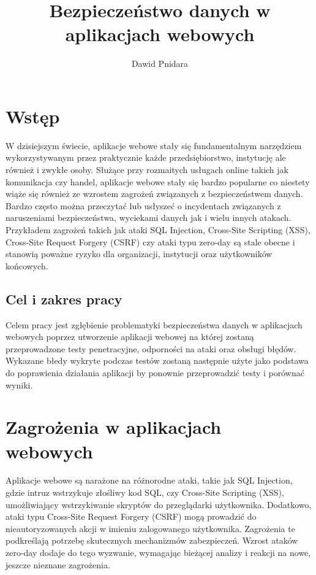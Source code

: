 \documentclass[12pt,twoside]{article}
\author{Dawid Pnidara}
\title{Bezpieczeństwo danych w aplikacjach webowych}
\begin{document}
\maketitle

\blankpage

\tableofcontents

\clearpage
\blankpage

\section{Wstęp}
W dzisiejszym świecie, aplikacje webowe stały się fundamentalnym narzędziem wykorzystywanym przez praktycznie każde przedsiębiorstwo, instytucję ale również i zwykłe osoby. Służące przy rozmaitych usługach online takich jak komunikacja czy handel, aplikacje webowe stały się bardzo popularne co niestety wiąże się również ze wzrostem zagrożeń związanych z bezpieczeństwem danych. 
Bardzo często można przeczytać lub usłyszeć o incydentach związanych z naruszeniami bezpieczeństwa, wyciekami danych jak i wielu innych atakach. Przykładem zagrożeń takich jak ataki SQL Injection, Cross-Site Scripting (XSS), Cross-Site Request Forgery (CSRF) czy ataki typu zero-day są stale obecne i stanowią poważne ryzyko dla organizacji, instytucji oraz użytkowników końcowych.
\subsection{Cel i zakres pracy}
Celem pracy jest zgłębienie problematyki bezpieczeństwa danych w aplikacjach webowych poprzez utworzenie aplikacji webowej na której zostaną przeprowadzone testy penetracyjne, odporności na ataki oraz obsługi błędów. Wykazane błedy wykryte podczas testów zostaną następnie użyte jako podstawa do poprawienia działania aplikacji by ponownie przeprowadzić testy i porównać wyniki.
\section{Zagrożenia w aplikacjach webowych}

Aplikacje webowe są narażone na różnorodne ataki, takie jak SQL Injection, gdzie intruz wstrzykuje złośliwy kod SQL, czy Cross-Site Scripting (XSS), umożliwiający wstrzykiwanie skryptów do przeglądarki użytkownika. Dodatkowo, ataki typu Cross-Site Request Forgery (CSRF) mogą prowadzić do nieautoryzowanych akcji w imieniu zalogowanego użytkownika. Zagrożenia te podkreślają potrzebę skutecznych mechanizmów zabezpieczeń. Wzrost ataków zero-day dodaje do tego wyzwanie, wymagając bieżącej analizy i reakcji na nowe, jeszcze nieznane zagrożenia.
\end{document}
